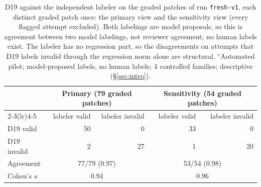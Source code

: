 \begin{table}[t]\centering\footnotesize
\caption{D19 against the independent labeler on the graded patches of run \texttt{fresh-v1}, each distinct graded patch once: the primary view and the sensitivity view (every flagged attempt excluded). Both labelings are model proposals, so this is agreement between two model labelings, not reviewer agreement; no human labels exist. The labeler has no regression part, so the disagreements on attempts that D19 labels invalid through the regression norm alone are structural. $^{\diamond}$Automated pilot; model-proposed labels, no human labels; 4 controlled families; descriptive (\S\ref{sec:intro}).}\label{tab:fresh-agree}
\begin{tabular}{lrrrr}\toprule  & \multicolumn{2}{c}{Primary (79 graded patches)} & \multicolumn{2}{c}{Sensitivity (54 graded patches)} \\\cmidrule(lr){2-3}\cmidrule(lr){4-5} & labeler valid & labeler invalid & labeler valid & labeler invalid \\\midrule
D19 valid & 50 & 0 & 33 & 0 \\
D19 invalid & 2 & 27 & 1 & 20 \\\midrule
Agreement & \multicolumn{2}{c}{77/79 (0.97)} & \multicolumn{2}{c}{53/54 (0.98)} \\
Cohen's $\kappa$ & \multicolumn{2}{c}{0.94} & \multicolumn{2}{c}{0.96} \\
\bottomrule\end{tabular}\end{table}
